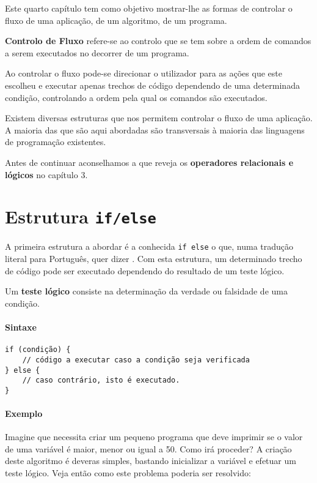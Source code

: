 Este quarto capítulo tem como objetivo mostrar-lhe as formas de controlar o fluxo de uma aplicação, de um algoritmo, de um programa.

\begin{defi}
\textbf{Controlo de Fluxo} refere-se ao controlo que se tem sobre a ordem de comandos a serem executados no decorrer de um programa.
\end{defi}

Ao controlar o fluxo pode-se direcionar o utilizador para as ações que este escolheu e executar apenas trechos de código dependendo de uma determinada condição, controlando a ordem pela qual os comandos são executados.

Existem diversas estruturas que nos permitem controlar o fluxo de uma aplicação. A maioria das que são aqui abordadas são transversais à maioria das linguagens de programação existentes.

Antes de continuar aconselhamos a que reveja os \textbf{operadores relacionais e lógicos} no capítulo 3.

\section{Estrutura \texttt{if/else}}

A primeira estrutura a abordar é a conhecida \texttt{if else} o que, numa tradução literal para Português, quer dizer . Com esta estrutura, um determinado trecho de código pode ser executado dependendo do resultado de um teste lógico.

\begin{defi}
Um \textbf{teste lógico} consiste na determinação da verdade ou falsidade de uma condição.
\end{defi}

\paragraph{Sintaxe}

\begin{lstlisting}
if (condição) {  
    // código a executar caso a condição seja verificada
} else {  
    // caso contrário, isto é executado.  
}  
\end{lstlisting}

\paragraph{Exemplo}

Imagine que necessita criar um pequeno programa que deve imprimir se o valor de uma variável é maior, menor ou igual a 50. Como irá proceder? A criação deste algoritmo é deveras simples, bastando inicializar a variável e efetuar um teste lógico. Veja então como este problema poderia ser resolvido:

